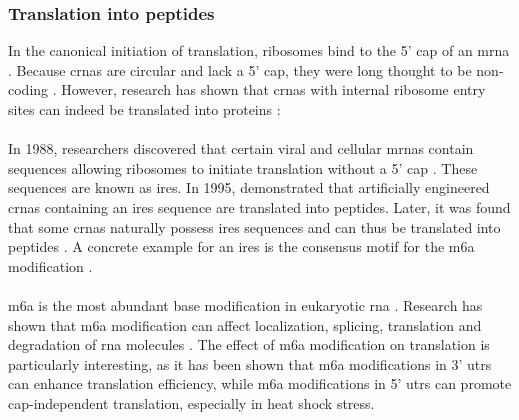 \subsubsection{Translation into peptides}
In the canonical initiation of translation, ribosomes bind to the 5' cap of an
\gls{mrna} \supercite{hinnebusch_mechanism_2012}.
Because \glspl{crna} are circular and lack a 5' cap, they were long thought to
be non-coding \supercite{bao_regulatory_2019,greene_circular_2017}.
However, research has shown that \glspl{crna} with internal ribosome entry
sites can indeed be translated into proteins \supercite{chen_expanding_2020}:

\paragraph{} In 1988, researchers discovered that certain
viral and cellular \glspl{mrna} contain sequences allowing ribosomes to
initiate translation without a 5' cap \supercite{pelletier_internal_1988,
    jang_segment_1988}.
These sequences are known as \gls{ires}.
In 1995, \textcite{chen_initiation_1995} demonstrated that artificially
engineered \glspl{crna} containing an \gls{ires} sequence are translated into
peptides.
Later, it was found that some \glspl{crna} naturally possess \gls{ires}
sequences and can thus be translated into peptides
\supercite{chen_expanding_2020,legnini_circ-znf609_2017,pamudurti_translation_2017}.
A concrete example for an \gls{ires} is the consensus motif for the \gls{m6a}
modification \supercite{yang_extensive_2017}.

\paragraph{}
\Gls{m6a} is the most abundant base modification in eukaryotic \gls{rna}
\supercite{yang_extensive_2017,li_pivotal_2014,wei_methylated_1975}.
Research has shown that \gls{m6a} modification can affect localization,
splicing, translation and degradation of \gls{rna} molecules
\supercite{yue_rna_2015,meyer_dynamic_2014}.
The effect of \gls{m6a} modification on translation is particularly
interesting, as it has been shown that \gls{m6a} modifications in 3'
\glspl{utr} can enhance translation
efficiency\supercite{wang_n6-methyladenosine_2015}, while \gls{m6a}
modifications in 5' \glspl{utr} can promote cap-independent translation,
especially in heat shock stress\supercite{zhou_dynamic_2015,meyer_5_2015}.

